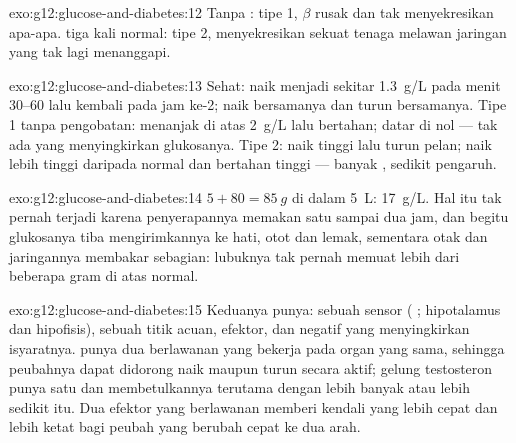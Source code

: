 \begin{solution}{exo:g12:glucose-and-diabetes:12}
Tanpa : tipe 1,  $\beta$  rusak dan tak
menyekresikan apa-apa.  tiga kali normal: tipe 2,  menyekresikan sekuat tenaga melawan jaringan yang tak lagi
menanggapi.
\end{solution}

\begin{solution}{exo:g12:glucose-and-diabetes:13}
Sehat:  naik menjadi sekitar \qty{1.3}{g/L} pada menit
30--60 lalu kembali pada jam ke-2;  naik bersamanya dan turun
bersamanya. Tipe 1 tanpa pengobatan:  menanjak di atas
\qty{2}{g/L} lalu bertahan;  datar di nol --- tak ada yang
menyingkirkan glukosanya. Tipe 2:  naik tinggi lalu turun
pelan;  naik lebih tinggi daripada normal dan bertahan
tinggi --- banyak , sedikit pengaruh.
\end{solution}

\begin{solution}{exo:g12:glucose-and-diabetes:14}
$5 + 80 = \qty{85}{g}$ di dalam \qty{5}{L}: \qty{17}{g/L}. Hal itu tak
pernah terjadi karena penyerapannya memakan satu sampai dua jam, dan
begitu glukosanya tiba  mengirimkannya ke  hati,
 otot dan lemak, sementara otak dan jaringannya membakar
sebagian: lubuknya tak pernah memuat lebih dari beberapa gram di atas
normal.
\end{solution}

\begin{solution}{exo:g12:glucose-and-diabetes:15}
Keduanya punya: sebuah sensor ( ; hipotalamus dan
hipofisis), sebuah titik acuan, efektor, dan  negatif yang
menyingkirkan isyaratnya.  punya dua  berlawanan yang
bekerja pada organ yang sama, sehingga peubahnya dapat didorong naik
maupun turun secara aktif; gelung testosteron punya satu  dan
membetulkannya terutama dengan lebih banyak atau lebih sedikit 
itu. Dua efektor yang berlawanan memberi kendali yang lebih cepat dan
lebih ketat bagi peubah yang berubah cepat ke dua arah.
\end{solution}


